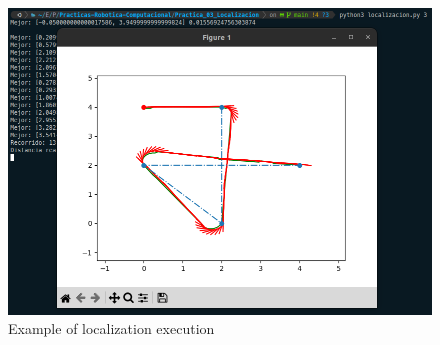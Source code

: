 \documentclass[11pt]{report}
\begin{document}
\begin{figure}[H]
  \centering
  \includegraphics[scale=0.42]{img/localizacion_1.png}
  \caption{Example of localization execution}
\end{figure}
\end{document}
